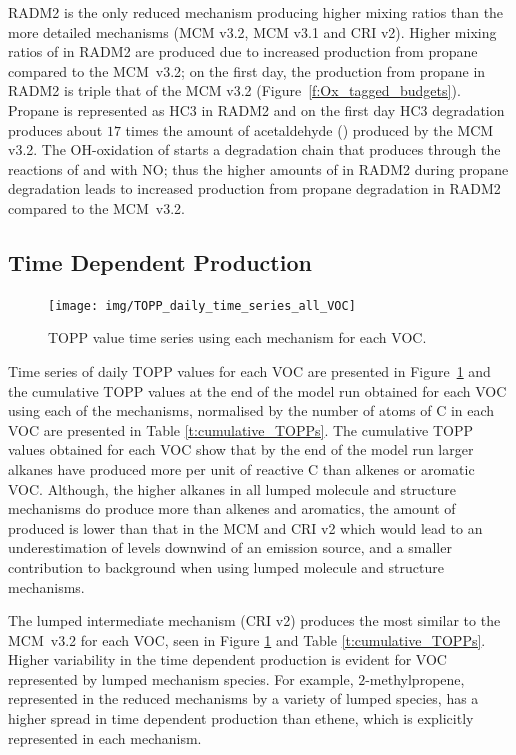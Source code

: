 RADM2 is the only reduced mechanism producing higher  mixing ratios than the more detailed mechanisms (MCM v3.2, MCM v3.1 and CRI v2).
Higher mixing ratios of  in RADM2 are produced due to increased  production from propane compared to the \mbox{MCM v3.2}; on the first day, the  production from propane in RADM2 is triple that of the MCM v3.2 \mbox{(Figure \ref{f:Ox_tagged_budgets})}.
Propane is represented as HC3 in RADM2 \citep{Stockwell:1990} and on the first day HC3 degradation produces about $17$ times the amount of acetaldehyde () produced by the MCM v3.2.
The OH-oxidation of  starts a degradation chain that produces  through the reactions of  and  with NO; thus the higher amounts of  in RADM2 during propane degradation leads to increased  production from propane degradation in RADM2 compared to the \mbox{MCM v3.2}.
%
\subsection[Time Dependent Ox Production]{Time Dependent  Production}
%
\begin{figure}
    \centering
    \caption{TOPP value time series using each mechanism for each VOC.}
    \texttt{[image: img/TOPP\_daily\_time\_series\_all\_VOC]}
    \vspace{-2mm}
    \label{f:TOPP_dailies}
\end{figure}
%
Time series of daily TOPP values for each VOC are presented in \mbox{Figure \ref{f:TOPP_dailies}} and the cumulative TOPP values at the end of the model run obtained for each VOC using each of the mechanisms, normalised by the number of atoms of C in each VOC are presented in Table \ref{t:cumulative_TOPPs}.
The cumulative TOPP values obtained for each VOC show that by the end of the model run larger alkanes have produced more  per unit of reactive C than alkenes or aromatic VOC.
Although, the higher alkanes in all lumped molecule and structure mechanisms do produce more  than alkenes and aromatics, the amount of  produced is lower than that in the MCM and CRI v2 which would lead to an underestimation of  levels downwind of an emission source, and a smaller contribution to background  when using lumped molecule and structure mechanisms.



%
The lumped intermediate mechanism (CRI v2) produces the most similar  to the \mbox{MCM v3.2} for each VOC, seen in Figure \ref{f:TOPP_dailies} and Table \ref{t:cumulative_TOPPs}.
Higher variability in the time dependent  production is evident for VOC represented by lumped mechanism species.
For example, $2$-methylpropene, represented in the reduced mechanisms by a variety of lumped species, has a higher spread in time dependent  production than ethene, which is explicitly represented in each mechanism.

